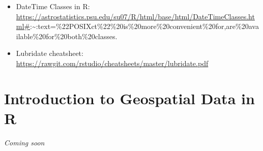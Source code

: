 \documentclass[
]{book}
\providecommand{\tightlist}{%
  \setlength{\itemsep}{0pt}\setlength{\parskip}{0pt}}
\begin{document}
\begin{itemize}
\tightlist
\item
  DateTime Classes in R: \url{https://astrostatistics.psu.edu/su07/R/html/base/html/DateTimeClasses.html\#}:\textasciitilde:text=\%22POSIXct\%22\%20is\%20more\%20convenient\%20for,are\%20available\%20for\%20both\%20classes.
\item
  Lubridate cheatsheet: \url{https://rawgit.com/rstudio/cheatsheets/master/lubridate.pdf}
\end{itemize}

\hypertarget{geospatial}{%
\chapter{Introduction to Geospatial Data in R}\label{geospatial}}

\emph{Coming soon}

  
\end{document}
